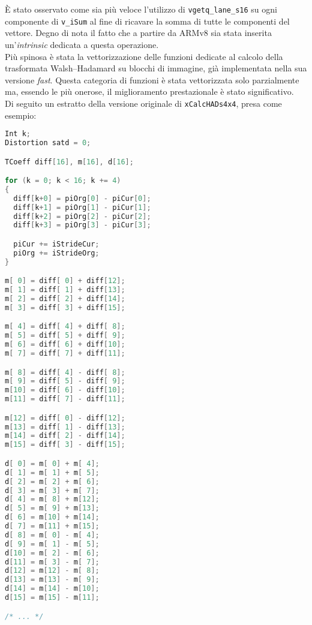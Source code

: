 \`E stato osservato come sia più veloce l'utilizzo di \verb|vgetq_lane_s16| su 
ogni componente di \verb|v_iSum| al fine di ricavare la somma di tutte le 
componenti del vettore. Degno di nota il fatto che a partire da ARMv8 sia stata 
inserita un'\emph{intrinsic} dedicata a questa operazione.\\

Più spinosa è stata la vettorizzazione delle funzioni dedicate al calcolo della 
trasformata Walsh–Hadamard su blocchi di immagine, già implementata nella sua 
versione \emph{fast}. Questa categoria di funzioni è stata vettorizzata solo 
parzialmente ma, essendo le più onerose, il miglioramento prestazionale è stato 
significativo.\\

Di seguito un estratto della versione originale di \verb|xCalcHADs4x4|, presa 
come esempio:

\begin{lstlisting}[language=C]
Int k;
Distortion satd = 0;

TCoeff diff[16], m[16], d[16];

for (k = 0; k < 16; k += 4)
{
  diff[k+0] = piOrg[0] - piCur[0];
  diff[k+1] = piOrg[1] - piCur[1];
  diff[k+2] = piOrg[2] - piCur[2];
  diff[k+3] = piOrg[3] - piCur[3];

  piCur += iStrideCur;
  piOrg += iStrideOrg;
}

m[ 0] = diff[ 0] + diff[12];
m[ 1] = diff[ 1] + diff[13];
m[ 2] = diff[ 2] + diff[14];
m[ 3] = diff[ 3] + diff[15];

m[ 4] = diff[ 4] + diff[ 8];
m[ 5] = diff[ 5] + diff[ 9];
m[ 6] = diff[ 6] + diff[10];
m[ 7] = diff[ 7] + diff[11];

m[ 8] = diff[ 4] - diff[ 8];
m[ 9] = diff[ 5] - diff[ 9];
m[10] = diff[ 6] - diff[10];
m[11] = diff[ 7] - diff[11];

m[12] = diff[ 0] - diff[12];
m[13] = diff[ 1] - diff[13];
m[14] = diff[ 2] - diff[14];
m[15] = diff[ 3] - diff[15];

d[ 0] = m[ 0] + m[ 4];
d[ 1] = m[ 1] + m[ 5];
d[ 2] = m[ 2] + m[ 6];
d[ 3] = m[ 3] + m[ 7];
d[ 4] = m[ 8] + m[12];
d[ 5] = m[ 9] + m[13];
d[ 6] = m[10] + m[14];
d[ 7] = m[11] + m[15];
d[ 8] = m[ 0] - m[ 4];
d[ 9] = m[ 1] - m[ 5];
d[10] = m[ 2] - m[ 6];
d[11] = m[ 3] - m[ 7];
d[12] = m[12] - m[ 8];
d[13] = m[13] - m[ 9];
d[14] = m[14] - m[10];
d[15] = m[15] - m[11];

/* ... */
\end{lstlisting}


